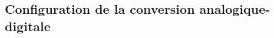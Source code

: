 \documentclass{article}
\begin{document}

    \subsection{Configuration de la conversion analogique-digitale}






\end{document}
